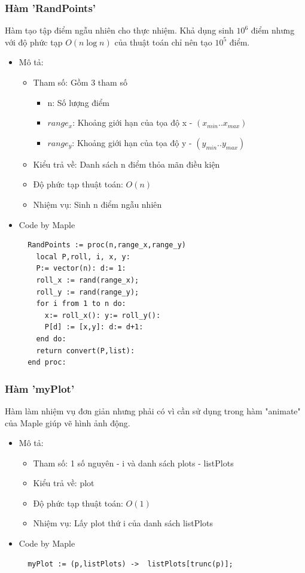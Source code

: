 \documentclass[12pt]{article}
\begin{document}
      \subsubsection{Hàm 'RandPoints'}
        Hàm tạo tập điểm ngẫu nhiên cho thực nhiệm. Khả dụng sinh $10^6$ điểm nhưng với độ phức tạp $O(n \log n)$ của thuật toán chỉ nên tạo $10^5$ điểm.
        \begin{itemize}
          \item Mô tả: 
          \begin{itemize}
            \item Tham số: Gồm 3 tham số
              \begin{itemize}
                \item n: Số lượng điểm
                \item $range_x$: Khoảng giới hạn của tọa độ x - $(x_{min}..x_{max})$ 
                \item $range_y$: Khoảng giới hạn của tọa độ y - $(y_{min}..y_{max})$ 
              \end{itemize}
            \item Kiểu trả về: Danh sách n điểm thỏa mãn điều kiện 
            \item Độ phức tạp thuật toán: $O(n)$
            \item Nhiệm vụ: Sinh n điểm ngẫu nhiên
          \end{itemize}
        \item Code by Maple
          \begin{verbatim}
  RandPoints := proc(n,range_x,range_y)
    local P,roll, i, x, y:
    P:= vector(n): d:= 1:
    roll_x := rand(range_x);
    roll_y := rand(range_y);
    for i from 1 to n do:
      x:= roll_x(): y:= roll_y():
      P[d] := [x,y]: d:= d+1:
    end do:
    return convert(P,list):
  end proc:
          \end{verbatim}
        \end{itemize}
        \newpage
      \subsubsection{Hàm 'myPlot'}
        Hàm làm nhiệm vụ đơn giản nhưng phải có vì cần sử dụng trong hàm "animate" của Maple giúp vẽ hình ảnh động.
        \begin{itemize}
          \item Mô tả:
          \begin{itemize}
            \item Tham số: 1 số nguyên - i và danh sách plots - listPlots
            \item Kiểu trả về: plot 
            \item Độ phức tạp thuật toán: $O(1)$
            \item Nhiệm vụ: Lấy plot thứ i của danh sách listPlots
          \end{itemize}
          \item Code by Maple
            \begin{verbatim}
  myPlot := (p,listPlots) ->  listPlots[trunc(p)];
            \end{verbatim}
        \end{itemize}
\end{document}
